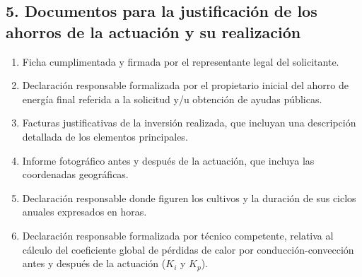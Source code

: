 \documentclass[12pt]{article}
\begin{document}
\begin{Form}
\section*{5. Documentos para la justificación de los ahorros de la actuación y su realización}
\begin{enumerate}
    \item Ficha cumplimentada y firmada por el representante legal del solicitante.
    \item Declaración responsable formalizada por el propietario inicial del ahorro de energía final referida a la solicitud y/u obtención de ayudas públicas.
    \item Facturas justificativas de la inversión realizada, que incluyan una descripción detallada de los elementos principales.
    \item Informe fotográfico antes y después de la actuación, que incluya las coordenadas geográficas.
    \item Declaración responsable donde figuren los cultivos y la duración de sus ciclos anuales expresados en horas.
    \item Declaración responsable formalizada por técnico competente, relativa al cálculo del coeficiente global de pérdidas de calor por conducción-convección antes y después de la actuación ($K_i$ y $K_p$).
\end{enumerate}
\end{Form}
\end{document}
